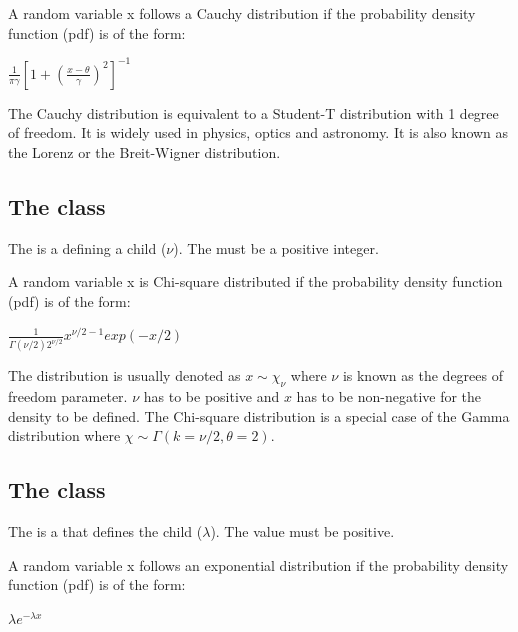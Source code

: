 A random variable x follows a Cauchy distribution if the probability density function (pdf) is of the form:

\begin{center}
$\frac{1}{\pi\gamma}\left[1+\left(\frac{x-\theta}{\gamma}\right)^2\right]^{-1}$
\end{center}

The Cauchy distribution is equivalent to a Student-T distribution with 1 degree of freedom. It is widely used in physics, optics and astronomy. It is also known as the Lorenz or the Breit-Wigner distribution.

\subsection{The  class}
\label{ChiSquareDistribution-class}
\label{chisquaredistribution-class}

The \ChiSquareDistribution is a \ContinuousUnivariateDistribution defining a \UncertValue child  ($\nu$).  The  must be a positive integer.

A random variable x is Chi-square distributed if the probability density function (pdf) is of the form:

\begin{center}
$\frac{1}{\Gamma(\nu/2)2^{\nu/2}}x^{\nu/2-1}exp(-x/2)$
\end{center}

The distribution is usually denoted as $x\sim\chi_\nu$ where $\nu$ is known as the degrees of freedom parameter. $\nu$ has to be positive and $x$ has to be non-negative for the density to be defined. The Chi-square distribution is a special case of the Gamma distribution where $\chi \sim\Gamma(k=\nu/2,\theta=2)$.

\subsection{The  class}
\label{ExponentialDistribution-class}
\label{exponentialdistribution-class}

The \ExponentialDistribution is a \ContinuousUnivariateDistribution that defines the \UncertValue child  ($\lambda$).  The  value must be positive.

A random variable x follows an exponential distribution if the probability density function (pdf) is of the form:

\begin{center}
$\lambda e^{-\lambda x}$
\end{center}

